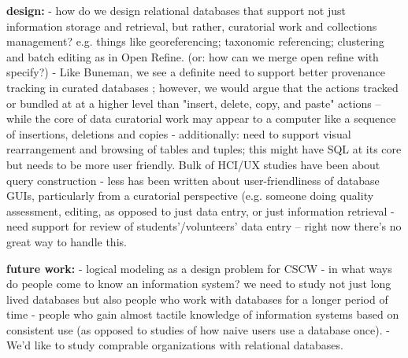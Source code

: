 \textbf{design: }
- how do we design relational databases that support not just information storage and retrieval, but rather,  curatorial work and collections management? e.g. things like georeferencing; taxonomic referencing; clustering and batch editing as in Open Refine. (or: how can we merge open refine with specify?)
- Like Buneman, we see a definite need to support better provenance tracking in curated databases \cite{Buneman_2006}; however, we would argue that the actions tracked or bundled at at a higher level than "insert, delete, copy, and paste" actions -- while the core of data curatorial work may appear to a computer like a sequence of insertions, deletions and copies
- additionally: need to support visual rearrangement and browsing of tables and tuples; this might have SQL at its core but needs to be more user friendly. Bulk of HCI/UX studies have been about query construction - less has been written about user-friendliness of database GUIs, particularly from a curatorial perspective (e.g. someone doing quality assessment, editing, as opposed to just data entry, or just information retrieval
- need support for review of students'/volunteers' data entry  -- right now there's no great way to handle this.

\textbf{future work:}
- logical modeling as a design problem for CSCW
- in what ways do people come to know an information system? we need to study not just long lived databases but also people who work with databases for a longer period of time - people who gain almost tactile knowledge of information systems based on consistent use (as opposed to studies of how naive users use a database once).
- We'd like to study comprable organizations with relational databases.